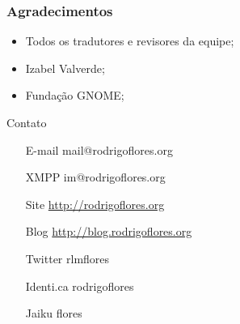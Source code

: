 \documentclass{beamer}
\begin{document}
\begin{frame}
  \frametitle{Agradecimentos}

  \begin{itemize}[<+->]
    \item Todos os tradutores e revisores da equipe;
    \item Izabel Valverde;
    \item Fundação GNOME;     
  \end{itemize}
\end{frame}

\begin{frame}
    \begin{block}{Contato}     
    \begin{itemize}
            \centering
            \item[E-mail] mail@rodrigoflores.org 
            \item[XMPP]  im@rodrigoflores.org        
            \item[Site]  \url{http://rodrigoflores.org}
            \item[Blog]  \url{http://blog.rodrigoflores.org}        
            \item[Twitter] rlmflores 
            \item[Identi.ca] rodrigoflores        
            \item[Jaiku] flores        
        \end{itemize}
    \end{block}
\end{frame}
\end{document}

